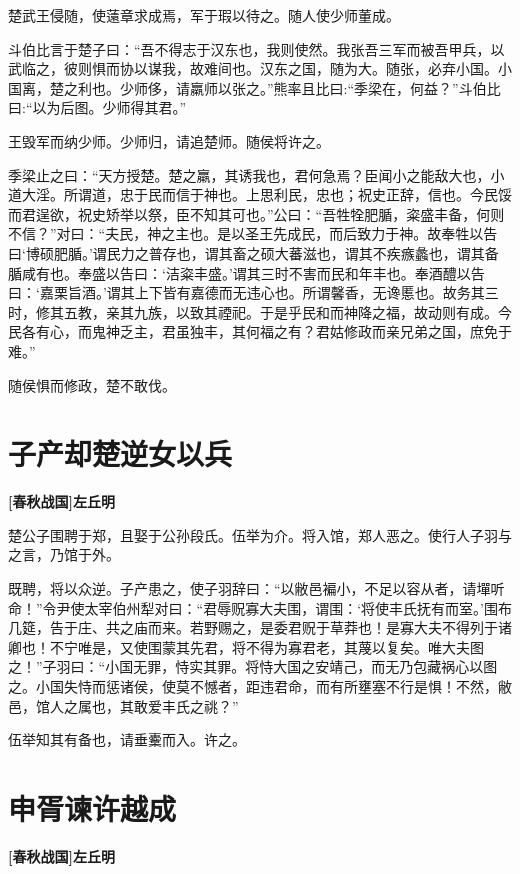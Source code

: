 \documentclass[UTF8,titlepage,oneside]{ctexbook}
\begin{document}
楚武王侵随，使薳章求成焉，军于瑕以待之。随人使少师董成。


斗伯比言于楚子曰：“吾不得志于汉东也，我则使然。我张吾三军而被吾甲兵，以武临之，彼则惧而协以谋我，故难间也。汉东之国，随为大。随张，必弃小国。小国离，楚之利也。少师侈，请羸师以张之。”熊率且比曰:“季梁在，何益？”斗伯比曰:“以为后图。少师得其君。”


王毁军而纳少师。少师归，请追楚师。随侯将许之。


季梁止之曰：“天方授楚。楚之羸，其诱我也，君何急焉？臣闻小之能敌大也，小道大淫。所谓道，忠于民而信于神也。上思利民，忠也；祝史正辞，信也。今民馁而君逞欲，祝史矫举以祭，臣不知其可也。”公曰：“吾牲牷肥腯，粢盛丰备，何则不信？”对曰：“夫民，神之主也。是以圣王先成民，而后致力于神。故奉牲以告曰‘博硕肥腯。’谓民力之普存也，谓其畜之硕大蕃滋也，谓其不疾瘯蠡也，谓其备腯咸有也。奉盛以告曰：‘洁粢丰盛。’谓其三时不害而民和年丰也。奉酒醴以告曰：‘嘉栗旨酒。’谓其上下皆有嘉德而无违心也。所谓馨香，无谗慝也。故务其三时，修其五教，亲其九族，以致其禋祀。于是乎民和而神降之福，故动则有成。今民各有心，而鬼神乏主，君虽独丰，其何福之有？君姑修政而亲兄弟之国，庶免于难。”


随侯惧而修政，楚不敢伐。



\chapter*{子产却楚逆女以兵}
\begin{center}
	\textbf{[春秋战国]左丘明}
\end{center}


楚公子围聘于郑，且娶于公孙段氏。伍举为介。将入馆，郑人恶之。使行人子羽与之言，乃馆于外。


既聘，将以众逆。子产患之，使子羽辞曰：“以敝邑褊小，不足以容从者，请墠听命！”令尹使太宰伯州犁对曰：“君辱贶寡大夫围，谓围：‘将使丰氏抚有而室。’围布几筵，告于庄、共之庙而来。若野赐之，是委君贶于草莽也！是寡大夫不得列于诸卿也！不宁唯是，又使围蒙其先君，将不得为寡君老，其蔑以复矣。唯大夫图之！”子羽曰：“小国无罪，恃实其罪。将恃大国之安靖己，而无乃包藏祸心以图之。小国失恃而惩诸侯，使莫不憾者，距违君命，而有所壅塞不行是惧！不然，敝邑，馆人之属也，其敢爱丰氏之祧？”


伍举知其有备也，请垂櫜而入。许之。



\chapter*{申胥谏许越成}
\begin{center}
	\textbf{[春秋战国]左丘明}
\end{center}
\end{document}
